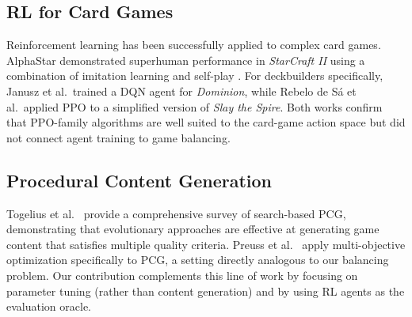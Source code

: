 \subsection{RL for Card Games}

Reinforcement learning has been successfully applied to complex card games. AlphaStar demonstrated superhuman performance in \textit{StarCraft II} using a combination of imitation learning and self-play \cite{yannakakis2018artificial}. For deckbuilders specifically, Janusz et al.\ trained a DQN agent for \textit{Dominion}, while Rebelo de Sá et al.\ applied PPO to a simplified version of \textit{Slay the Spire}. Both works confirm that PPO-family algorithms are well suited to the card-game action space but did not connect agent training to game balancing.

\subsection{Procedural Content Generation}

Togelius et al.\ \cite{togelius2011search} provide a comprehensive survey of search-based PCG, demonstrating that evolutionary approaches are effective at generating game content that satisfies multiple quality criteria. Preuss et al.\ \cite{preuss2012multiobjective} apply multi-objective optimization specifically to PCG, a setting directly analogous to our balancing problem. Our contribution complements this line of work by focusing on parameter tuning (rather than content generation) and by using RL agents as the evaluation oracle.
